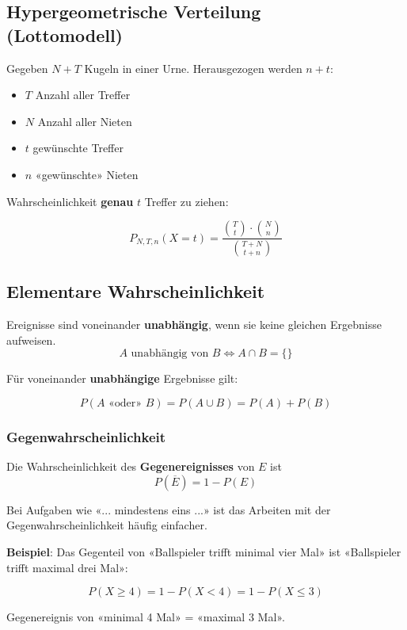 \begin{multicols}{2}
\subsection*{Hypergeometrische Verteilung\\ (Lottomodell)}
\begin{tcolorbox}[colback=white]
Gegeben $N+T$ Kugeln in einer Urne. Herausgezogen werden $n+t$:
\begin{itemize}
\item $T$ Anzahl aller Treffer
\item $N$ Anzahl aller Nieten
\item $t$ gewünschte Treffer
\item $n$ «gewünschte» Nieten
\end{itemize}
Wahrscheinlichkeit \textbf{genau} $t$ Treffer zu ziehen:

$$P_{N,T,n}(X=t) = \frac{ {T \choose t} \cdot {N  \choose n} }{{T+N \choose t+n}}$$

\end{tcolorbox}



\subsection*{Elementare Wahrscheinlichkeit}
Ereignisse sind voneinander \textbf{unabhängig}, wenn sie keine
gleichen Ergebnisse aufweisen.
$$A \textrm{ unabhängig von } B \Leftrightarrow A\cap B=\{\}$$

Für voneinander \textbf{unabhängige} Ergebnisse 
gilt:

$$P(A\textrm{ «oder» }B) = P(A\cup B) = P(A) + P(B)$$
\keinHeaderUndKeinFooter{}

\forceCB
\keinHeaderUndKeinFooter{}

\subsubsection*{Gegenwahrscheinlichkeit}
Die Wahrscheinlichkeit des \textbf{Gegenereignisses} von $E$ ist
$$P(\overline{E}) = 1- P(E)$$

Bei Aufgaben wie «... mindestens eins ...» ist das Arbeiten mit der
Gegenwahrscheinlichkeit häufig einfacher.

\textbf{Beispiel}: Das Gegenteil von «Ballspieler trifft minimal vier Mal»
ist «Ballspieler trifft maximal drei Mal»:

$$P(X \ge 4) = 1 - P(X < 4) = 1-P(X\le 3)$$

Gegenereignis von «minimal 4 Mal» = «maximal 3 Mal».


\end{multicols}
